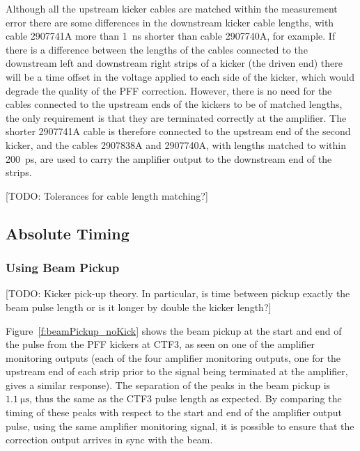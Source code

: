 Although all the upstream kicker cables are matched within the measurement error there are some differences in the downstream kicker cable lengths, with cable 2907741A more than 1~ns shorter than cable 2907740A, for example. If there is a difference between the lengths of the cables connected to the downstream left and downstream right strips of a kicker (the driven end) there will be a time offset in the voltage applied to each side of the kicker, which would degrade the quality of the PFF correction. However, there is no need for the cables connected to the upstream ends of the kickers to be of matched lengths, the only requirement is that they are terminated correctly at the amplifier. The shorter 2907741A cable is therefore connected to the upstream end of the second kicker, and the cables 2907838A and 2907740A, with lengths matched to within 200~ps, are used to carry the amplifier output to the downstream end of the strips.

[TODO: Tolerances for cable length matching?]






\subsection{Absolute Timing}
\label{ss:absTiming}



\subsubsection{Using Beam Pickup}
\label{sss:beamPickup}

[TODO: Kicker pick-up theory. In particular, is time between pickup exactly the beam pulse length or is it longer by double the kicker length?]

Figure~\ref{f:beamPickup_noKick} shows the beam pickup at the start and end of the pulse from the PFF kickers at CTF3, as seen on one of the amplifier monitoring outputs (each of the four amplifier monitoring outputs, one for the upstream end of each strip prior to the signal being terminated at the amplifier, gives a similar response). The separation of the peaks in the beam pickup is \(1.1~\mathrm{\mu s}\), thus the same as the CTF3 pulse length as expected. By comparing the timing of these peaks with respect to the start and end of the amplifier output pulse, using the same amplifier monitoring signal, it is possible to ensure that the correction output arrives in sync with the beam.

